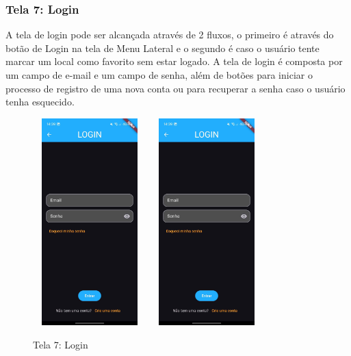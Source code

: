     \FloatBarrier

\subsubsection{Tela 7: Login}

    A tela de login pode ser alcançada através de 2 fluxos, o primeiro é através do botão de Login na tela de Menu Lateral e o segundo é caso o usuário tente marcar um local como favorito sem estar logado. A tela de login é composta por um campo de e-mail e um campo de senha, além de botões para iniciar o processo de registro de uma nova conta ou para recuperar a senha caso o usuário tenha esquecido.

    \begin{figure}[h]
        \centering
        \includegraphics[width=44mm,height=80mm]{imagens/login.jpg}
        \hspace{10mm}
        \includegraphics[width=44mm,height=80mm]{imagens/login.jpg} %
        \caption{\scriptsize Tela 7: Login}
        \footnotesize  {}
        \label{fig:tela7}
    \end{figure}
    
